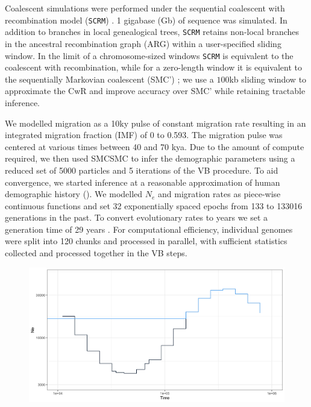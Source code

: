 Coalescent simulations were performed under the sequential coalescent with recombination model ({\tt SCRM}) \cite{Staab2015}. 1 gigabase (Gb) of sequence was simulated.  In addition to branches in local genealogical trees, {\tt SCRM} retains non-local branches in the ancestral recombination graph (ARG) within a user-specified sliding window.  In the limit of a chromosome-sized windows {\tt SCRM} is equivalent to the coalescent with recombination, while for a zero-length window it is equivalent to the sequentially Markovian coalescent (SMC') \cite{McVean2005,Marjoram2006}; we use a $100$kb sliding window to approximate the CwR and improve accuracy over SMC' while retaining tractable inference.

We modelled migration as a 10ky pulse of constant migration rate resulting in an integrated migration fraction (IMF) of 0 to 0.593. The migration pulse was centered at various times between 40 and 70 kya.  Due to the amount of compute required, we then used SMCSMC to infer the demographic parameters using a reduced set of 5000 particles and 5 iterations of the VB procedure. To aid convergence, we started inference at a reasonable approximation of human demographic history (). We modelled $N_e$ and migration rates as piece-wise continuous functions and set 32 exponentially spaced epochs from 133 to 133016 generations in the past. To convert evolutionary rates to years we set a generation time of 29 years \cite{Fenner2005}.  For computational efficiency, individual genomes were split into 120 chunks and processed in parallel, with sufficient statistics collected and processed together in the VB steps.


\begin{figure}[hb]
  \centering
  \includegraphics[width = 0.5\linewidth]{plot/demographic_model.png}
  \label{fig:dem}
\end{figure}

